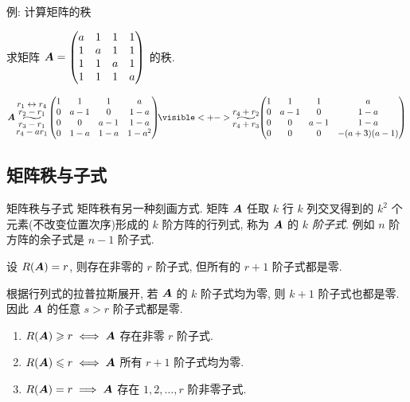 \begin{frame}{例: 计算矩阵的秩}
	\onslide<+->
	\begin{example}
		求矩阵 ${\boldsymbol{A}}=\begin{pmatrix}
			a&1&1&1\\
			1&a&1&1\\
			1&1&a&1\\
			1&1&1&a
		\end{pmatrix}$ 的秩.
	\end{example}
	\onslide<+->
	\begin{solution}
		\[\bfA\!\wsim{\substack{\nsmath{r_1\swap r_4}\\\nsmath{r_2-r_1}}}{\substack{\nsmath{r_3-r_1}\\\nsmath{r_4-ar_1}}}\!\begin{pmatrix}
			1&1&1&a\\
			0&a-1&0&1-a\\
			0&0&a-1&1-a\\
			0&1-a&1-a&1-a^2
		\end{pmatrix}\!\!\visible<+->{\wsim{r_4+r_2}{r_4+r_3}\!\!\begin{pmatrix}
			1&1&1&a\\
			0&a-1&0&1-a\\
			0&0&a-1&1-a\\
			0&0&0&-(a+3)(a-1)
		\end{pmatrix}}\]
		\onslide<+->{%
			$a=1$ 时, $R(\bfA)=1$.
		}
	\end{solution}
\end{frame}


\subsection{矩阵秩与子式}

\begin{frame}{矩阵秩与子式}
	\onslide<+->
	矩阵秩有另一种刻画方式.
	\onslide<+->
	矩阵 ${\boldsymbol{A}}$ 任取 $k$ 行 $k$ 列交叉得到的 $k^2$ 个元素(不改变位置次序)形成的 $k$ 阶方阵的行列式,
	\onslide<+->
	称为 ${\boldsymbol{A}}$ 的 \emph{$k$ 阶子式}.
	\onslide<+->
	例如 $n$ 阶方阵的余子式是 $n-1$ 阶子式.

	\onslide<+->
	\begin{theorem}
		设 $R({\boldsymbol{A}})=r$, 则存在非零的 $r$ 阶子式, 但所有的 $r+1$ 阶子式都是零.
	\end{theorem}
	\onslide<+->
	根据行列式的拉普拉斯展开, 若 ${\boldsymbol{A}}$ 的 $k$ 阶子式均为零, 则 $k+1$ 阶子式也都是零.
	\onslide<+->
	因此 ${\boldsymbol{A}}$ 的任意 $s>r$ 阶子式都是零.
	\onslide<+->
	\begin{corollary}
		\begin{enumerate}
			\item $R({\boldsymbol{A}})\geqslant r\iff{\boldsymbol{A}}$ 存在非零 $r$ 阶子式.
			\item $R({\boldsymbol{A}})\leqslant r\iff{\boldsymbol{A}}$ 所有 $r+1$ 阶子式均为零.
			\item $R({\boldsymbol{A}})=r\implies {\boldsymbol{A}}$ 存在 $1,2,\dots,r$ 阶非零子式. 
		\end{enumerate}
	\end{corollary}
\end{frame}



